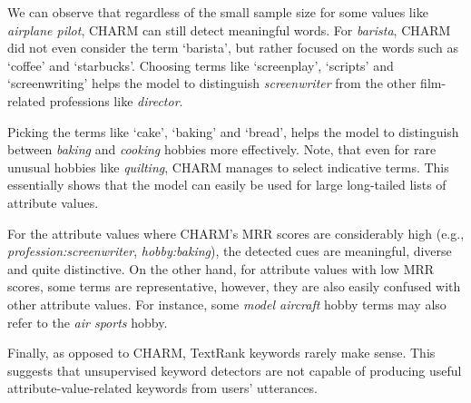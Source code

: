 We can observe that regardless of the small sample size for some values like \textit{airplane pilot}, CHARM can still detect meaningful words. For \textit{barista}, CHARM did not even consider the term `barista', but rather focused on the words such as `coffee' and `starbucks'. 
Choosing terms like `screenplay', `scripts' and `screenwriting' helps the model to distinguish \textit{screenwriter} from the other film-related professions like \emph{director}.

Picking the terms like `cake', `baking' and `bread', helps the model to distinguish between \textit{baking} and \textit{cooking} hobbies more effectively.
Note, that even for rare unusual hobbies like \textit{quilting}, CHARM manages to select indicative terms. This essentially shows that the model can easily be used for large long-tailed lists of attribute values.

For the attribute values where CHARM's MRR scores are considerably high (e.g., \emph{profession:screenwriter}, \emph{hobby:baking}), the detected cues are meaningful, diverse and quite distinctive. 
On the other hand, for attribute values with low MRR scores, some terms are representative, however, they are also easily confused with other attribute values. For instance, some \emph{model aircraft} hobby terms  may also refer to the \emph{air sports} hobby.

Finally, as opposed to CHARM, TextRank keywords rarely make sense. This suggests that unsupervised keyword detectors are not capable of producing useful attribute-value-related keywords from users' utterances. 


